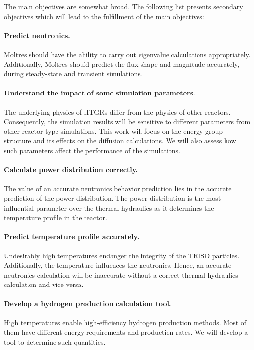 \vskip 0.6cm
The main objectives are somewhat broad.
The following list presents secondary objectives which will lead to the fulfillment of the main objectives:

\paragraph{Predict neutronics.}
Moltres should have the ability to carry out eigenvalue calculations appropriately.
Additionally, Moltres should predict the flux shape and magnitude accurately, during steady-state and transient simulations.

\paragraph{Understand the impact of some simulation parameters.}
The underlying physics of \glspl{HTGR} differ from the physics of other reactors.
Consequently, the simulation results will be sensitive to different parameters from other reactor type simulations.
This work will focus on the energy group structure and its effects on the diffusion calculations.
We will also assess how such parameters affect the performance of the simulations. 

\paragraph{Calculate power distribution correctly.}
The value of an accurate neutronics behavior prediction lies in the accurate prediction of the power distribution.
The power distribution is the most influential parameter over the thermal-hydraulics as it determines the temperature profile in the reactor.

\paragraph{Predict temperature profile accurately.}
Undesirably high temperatures endanger the integrity of the TRISO particles.
Additionally, the temperature influences the neutronics.
Hence, an accurate neutronics calculation will be inaccurate without a correct thermal-hydraulics calculation and vice versa. 

\paragraph{Develop a hydrogen production calculation tool.}
High temperatures enable high-efficiency hydrogen production methods.
Most of them have different energy requirements and production rates.
We will develop a tool to determine such quantities.